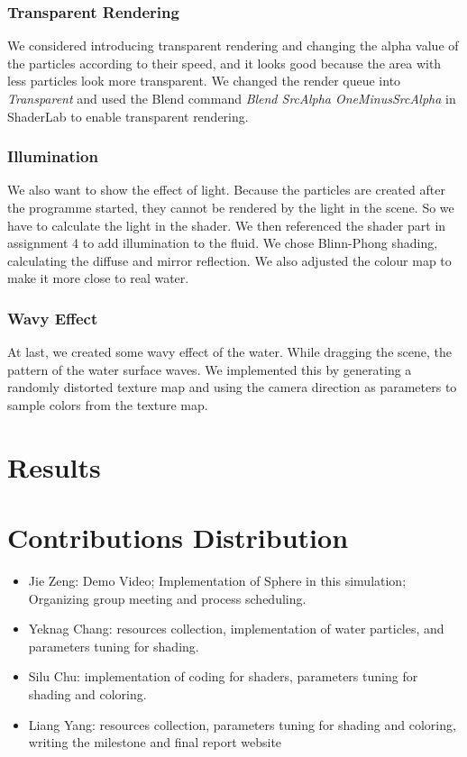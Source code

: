 \documentclass{article}
\begin{document}
\subsubsection{Transparent Rendering}
\hspace{1em} We considered introducing transparent rendering and changing the alpha value of the particles according to their speed, and it looks good because the area with less particles look more transparent. We changed the render queue into \textit{Transparent} and used the Blend command \textit{Blend SrcAlpha OneMinusSrcAlpha} in ShaderLab to enable transparent rendering.
\subsubsection{Illumination}
\hspace{1em} We also want to show the effect of light. Because the particles are created after the programme started, they cannot be rendered by the light in the scene. So we have to calculate the light in the shader. We then referenced the shader part in assignment 4 to add illumination to the fluid. We chose Blinn-Phong shading, calculating the diffuse and mirror reflection. We also adjusted the colour map to make it more close to real water.
\subsubsection{Wavy Effect}
\hspace{1em} At last, we created some wavy effect of the water. While dragging the scene, the pattern of the water surface waves. We implemented this by generating a randomly distorted texture map and using the camera direction as parameters to sample colors from the texture map.

\section{Results}




\section{Contributions Distribution}
\begin{itemize}
    \item Jie Zeng: Demo Video; Implementation of Sphere in this simulation; Organizing group meeting and process scheduling.
    \item Yeknag Chang: resources collection, implementation of water particles, and parameters tuning for shading.
    \item Silu Chu: implementation of coding for shaders, parameters tuning for shading and coloring.
    \item Liang Yang: resources collection, parameters tuning for shading and coloring, writing the milestone and final report website
\end{itemize}
    
\end{document}
